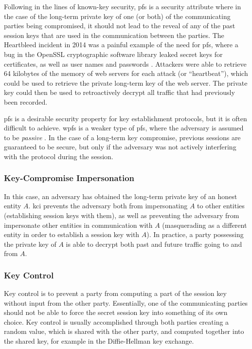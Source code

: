 Following in the lines of known-key security, \gls{pfs} is a security attribute where in the case of the long-term private key of one (or both) of the communicating parties being compromised, it should not lead to the reveal of any of the past session keys that are used in the communication between the parties. The Heartbleed incident in 2014 was a painful example of the need for \gls{pfs}, where a bug in the OpenSSL cryptographic software library leaked secret keys for certificates, as well as user names and passwords \cite{durumeric2014matter}. Attackers were able to retrieve 64 kilobytes of the memory of web servers for each attack (or ``heartbeat''), which could be used to retrieve the private long-term key of the web server. The private key could then be used to retroactively decrypt all traffic that had previously been recorded.

\gls{pfs} is a desirable security property for key establishment protocols, but it is often difficult to achieve. \gls{wpfs} is a weaker type of \gls{pfs}, where the adversary is assumed to be \emph{passive} \cite{krawczyk2005hmqv}. In the case of a long-term key compromise, previous sessions are guaranteed to be secure, but only if the adversary was not actively interfering with the protocol during the session. 

\subsubsection{Key-Compromise Impersonation}

In this case, an adversary has obtained the long-term private key of an honest entity $A$. \gls{kci} prevents the adversary both from impersonating $A$ to other entities (establishing session keys with them), as well as preventing the adversary from impersonate other entities in communication with $A$ (masquerading as a different entity in order to establish a session key with $A$). In practice, a party possessing the private key of $A$ is able to decrypt both past and future traffic going to and from $A$.


\subsubsection{Key Control}

Key control is to prevent a party from computing a part of the session key without input from the other party. Essentially, one of the communicating parties should not be able to force the secret session key into something of its own choice. Key control is usually accomplished through both parties creating a random value, which is shared with the other party, and computed together into the shared key, for example in the Diffie-Hellman key exchange.

